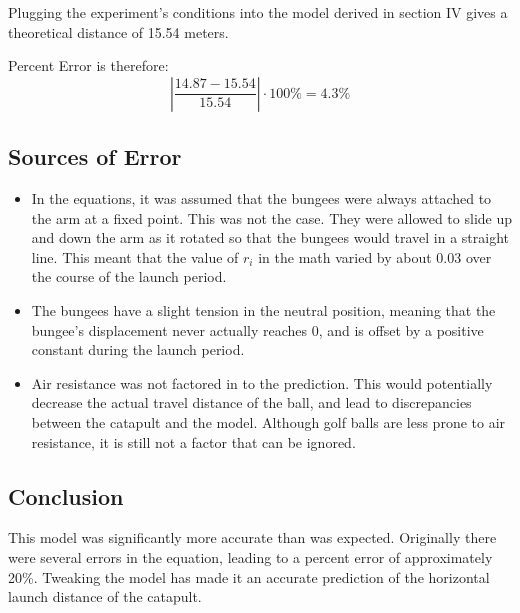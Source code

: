 \documentclass[10pt]{article}
\begin{document}
\begin{flushleft}
      Plugging the experiment's conditions into the model derived in section IV gives a theoretical distance of 15.54 meters.

      \par 
      Percent Error is therefore:
      $$ \left| \frac{14.87 - 15.54}{15.54} \right| \cdot 100\% = 4.3\% $$

    \subsection{Sources of Error}
      \begin{itemize}
        \item In the equations, it was assumed that the bungees were always attached to the arm at a fixed point. 
          This was not the case. 
          They were allowed to slide up and down the arm as it rotated so that the bungees would travel in a straight line.
          This meant that the value of $r_i$ in the math varied by about 0.03 over the course of the launch period.
        \item The bungees have a slight tension in the neutral position, meaning that the bungee's displacement never actually reaches 0, and is offset by a positive constant during the launch period.
        \item Air resistance was not factored in to the prediction. 
          This would potentially decrease the actual travel distance of the ball, and lead to discrepancies between the catapult and the model.
          Although golf balls are less prone to air resistance, it is still not a factor that can be ignored.
      \end{itemize}

    \subsection{Conclusion}
      This model was significantly more accurate than was expected. Originally there were several errors in the equation, leading to a percent error of approximately 20\%. Tweaking the model has made it an accurate prediction of the horizontal launch distance of the catapult.

\end{flushleft}
\end{document}
